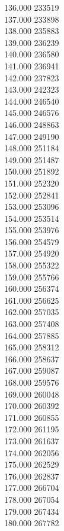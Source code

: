 { 136.000	233519 \\
 137.000	233898 \\
 138.000	235883 \\
 139.000	236239 \\
 140.000	236580 \\
 141.000	236941 \\
 142.000	237823 \\
 143.000	242323 \\
 144.000	246540 \\
 145.000	246576 \\
 146.000	248863 \\
 147.000	249190 \\
 148.000	251184 \\
 149.000	251487 \\
 150.000	251892 \\
 151.000	252320 \\
 152.000	252841 \\
 153.000	253096 \\
 154.000	253514 \\
 155.000	253976 \\
 156.000	254579 \\
 157.000	254920 \\
 158.000	255322 \\
 159.000	255766 \\
 160.000	256374 \\
 161.000	256625 \\
 162.000	257035 \\
 163.000	257408 \\
 164.000	257885 \\
 165.000	258312 \\
 166.000	258637 \\
 167.000	259087 \\
 168.000	259576 \\
 169.000	260048 \\
 170.000	260392 \\
 171.000	260855 \\
 172.000	261195 \\
 173.000	261637 \\
 174.000	262056 \\
 175.000	262529 \\
 176.000	262837 \\
 177.000	266704 \\
 178.000	267054 \\
 179.000	267434 \\
 180.000	267782 \\
}

